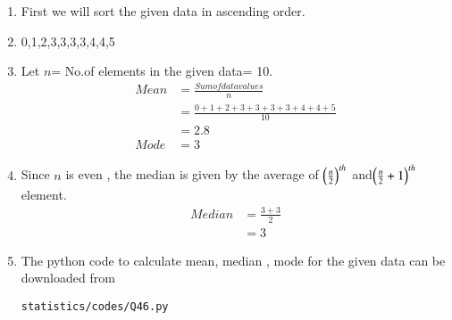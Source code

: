 \renewcommand{\theequation}{\theenumi}
\begin{enumerate}[label=\thesection.\arabic*.,ref=\thesection.\theenumi]
\item First we will sort the given data in ascending order.  
\item 0,1,2,3,3,3,3,4,4,5
\item Let $n$= No.of elements in the given data= 10.
\begin{align}
Mean &= \frac{Sum of data values}{n}\\
&= \frac{0+1+2+3+3+3+3+4+4+5}{10}\\
&= 2.8\\
Mode &= 3
\end{align}
\item Since $n$ is even , the median is given by the average of $\left(\frac{n}{2}\right)^{th}$ and$\left(\frac{n}{2}+1\right)^{th}$ element.
\begin{align}
Median &= \frac{3+3}{2}\\
&= 3
\end{align} 
\item The python code to calculate mean, median , mode for the given data can be downloaded from 
\begin{lstlisting}
statistics/codes/Q46.py
\end{lstlisting}

\end{enumerate}